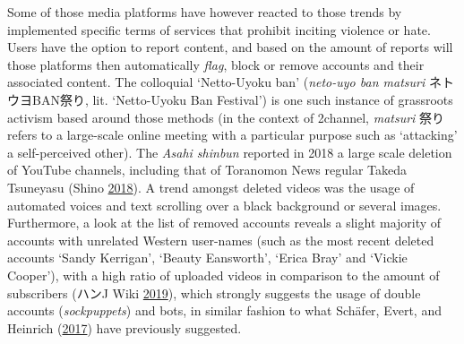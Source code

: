 \documentclass[10pt,british,A4paper,twoside]{memoir}
\begin{document}
Some of those media platforms have however reacted to those trends by
implemented specific terms of services that prohibit inciting violence
or hate. Users have the option to report content, and based on the
amount of reports will those platforms then automatically \emph{flag},
block or remove accounts and their associated content. The colloquial
`Netto-Uyoku ban' (\emph{neto-uyo ban matsuri} ネトウヨBAN祭り, lit.
`Netto-Uyoku Ban Festival') is one such instance of grassroots activism
based around those methods (in the context of 2channel, \emph{matsuri}
祭り refers to a large-scale online meeting with a particular purpose
such as `attacking' a self-perceived other). The \emph{Asahi shinbun}
reported in 2018 a large scale deletion of YouTube channels, including
that of Toranomon News regular Takeda Tsuneyasu (Shino
\protect\hyperlink{ref-shino_eng:_2018}{2018}). A trend amongst deleted
videos was the usage of automated voices and text scrolling over a black
background or several images. Furthermore, a look at the list of removed
accounts reveals a slight majority of accounts with unrelated Western
user-names (such as the most recent deleted accounts `Sandy Kerrigan',
`Beauty Eansworth', `Erica Bray' and `Vickie Cooper'), with a high ratio
of uploaded videos in comparison to the amount of subscribers (ハンJ
Wiki \protect\hyperlink{ref-j_wiki_completed_2019}{2019}), which
strongly suggests the usage of double accounts (\emph{sockpuppets}) and
bots, in similar fashion to what Schäfer, Evert, and Heinrich
(\protect\hyperlink{ref-schafer_japans_2017}{2017}) have previously
suggested.
\end{document}

